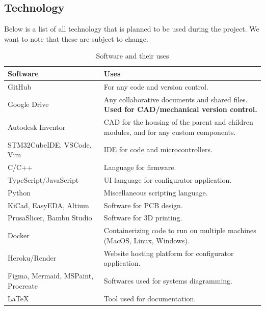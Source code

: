 \documentclass[a4]{article}
\begin{document}
\subsection{Technology}
Below is a list of all technology that is planned to be used during the project. We want to note that these are subject to change.
\begin{table}[h!]
	\renewcommand{\arraystretch}{1.2} %
	\centering
	\begin{tabularx}{\linewidth}{|Y|Y|}
		\hline
		\textcolor{McMasterMaroon}{\textbf{Software}} & \textcolor{McMasterMaroon}{\textbf{Uses}}                                              \\
		\hline
		GitHub                                        & For any code and version control.                                                      \\
		\hline
		Google Drive                                  & Any collaborative documents and shared files. \textbf{Used for CAD/mechanical version control.} \\
		\hline
		Autodesk Inventor                             & CAD for the housing of the parent and children modules, and for any custom components. \\
		\hline
		STM32CubeIDE, VSCode, Vim                     & IDE for code and microcontrollers.                                                     \\
		\hline
		C/C++                                         & Language for firmware.                                                                 \\
		\hline
		TypeScript/JavaScript                         & UI language for configurator application.                                              \\
		\hline
		Python                                        & Miscellaneous scripting language.                                                      \\
		\hline
		KiCad, EasyEDA, Altium                        & Software for PCB design.                                                               \\
		\hline
		PrusaSlicer, Bambu Studio                    & Software for 3D printing.                                                              \\
		\hline
		Docker                                        & Containerizing code to run on multiple machines (MacOS, Linux, Windows).               \\
		\hline
		Heroku/Render                                 & Website hosting platform for configurator application.                                 \\
		\hline
		Figma, Mermaid, MSPaint, Procreate            & Softwares used for systems diagramming.                                                \\
		\hline
		LaTeX                                         & Tool used for documentation.                                                           \\
		\hline
	\end{tabularx}
	\caption{Software and their uses}
\end{table}
\end{document}
